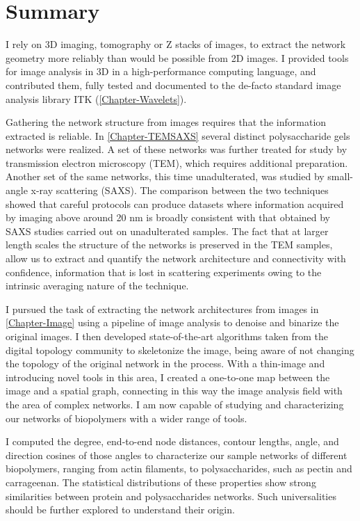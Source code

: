 \section{Summary}%
\label{sec:conclusions_summary}

I rely on 3D imaging, tomography or Z stacks of images, to extract the network geometry more reliably than would be possible from 2D images. I provided tools for image analysis in 3D in a high-performance computing language, and contributed them, fully tested and documented to the de-facto standard image analysis library ITK (\autoref{Chapter-Wavelets}).

Gathering the network structure from images requires that the information extracted is reliable. In \autoref{Chapter-TEMSAXS} several distinct polysaccharide gels networks were realized. A set of these networks was further treated for study by transmission electron microscopy (TEM), which requires additional preparation. Another set of the same networks, this time unadulterated, was studied by small-angle x-ray scattering (SAXS). The comparison between the two techniques showed that careful protocols can produce datasets where information acquired by imaging above around 20 nm is broadly consistent with that obtained by SAXS studies carried out on unadulterated samples.
The fact that at larger length scales the structure of the networks is preserved in the TEM samples, allow us to extract and quantify the network architecture and connectivity with confidence, information that is lost in scattering experiments owing to the intrinsic averaging nature of the technique.

I pursued the task of extracting the network architectures from images in \autoref{Chapter-Image} using a pipeline of image analysis to denoise and binarize the original images. I then developed state-of-the-art algorithms taken from the digital topology community to skeletonize the image, being aware of not changing the topology of the original network in the process. With a thin-image and introducing novel tools in this area, I created a one-to-one map between the image and a spatial graph, connecting in this way the image analysis field with the area of complex networks. I am now capable of studying and characterizing our networks of biopolymers with a wider range of tools.

I computed the degree, end-to-end node distances, contour lengths, angle, and direction cosines of those angles to characterize our sample networks of different biopolymers, ranging from actin filaments, to polysaccharides, such as pectin and carrageenan. The statistical distributions of these properties show strong similarities between protein and polysaccharides networks. Such universalities should be further explored to understand their origin.

